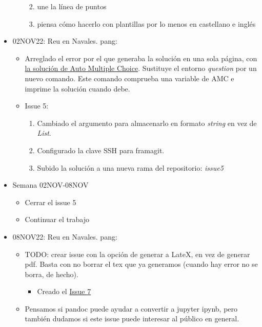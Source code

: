 \begin{itemize}
\begin{itemize}
\begin{enumerate}
\begin{itemize}
            \end{itemize}
            \item une la línea de puntos
            \item piensa cómo hacerlo con plantillas por lo menos en castellano e inglés
        \end{enumerate}
    \end{itemize}
    \item 02NOV22: Reu en Navales. pang:
    \begin{itemize}
        \item Arreglado el error por el que generaba la solución en una sola página, con \href{https://project.auto-multiple-choice.net/boards/2/topics/9759?r=9819#message-9819}%
        {la solución de Auto Multiple Choice}. Sustituye el entorno \textit{question} por un nuevo comando. Este comando comprueba una variable de AMC e imprime la solución cuando debe.
        \item Issue 5:
        \begin{enumerate}
            \item Cambiado el argumento para almacenarlo en formato \textit{string} en vez de \textit{List}.
            \item Configurado la clave SSH para framagit.
            \item Subido la solución a una nueva rama del repositorio: \textit{issue5}
        \end{enumerate}
    \end{itemize}
    \item Semana 02NOV-08NOV
    \begin{itemize}
        \item Cerrar el issue 5
        \item Continuar el trabajo
    \end{itemize}
    \item 08NOV22: Reu en Navales. pang:
    \begin{itemize}
        \item TODO: crear issue con la opción de generar a LateX, en vez de generar pdf. Basta con no borrar el tex que ya generamos (cuando hay error no se borra, de hecho).
        \begin{itemize}
            \item Creado el \href{https://framagit.org/pang/pyexams/-/issues/7}{Issue 7}
        \end{itemize}
        \item Pensamos si pandoc puede ayudar a convertir a jupyter ipynb, pero también dudamos si este issue puede interesar al público en general.

\end{itemize}
\end{itemize}
